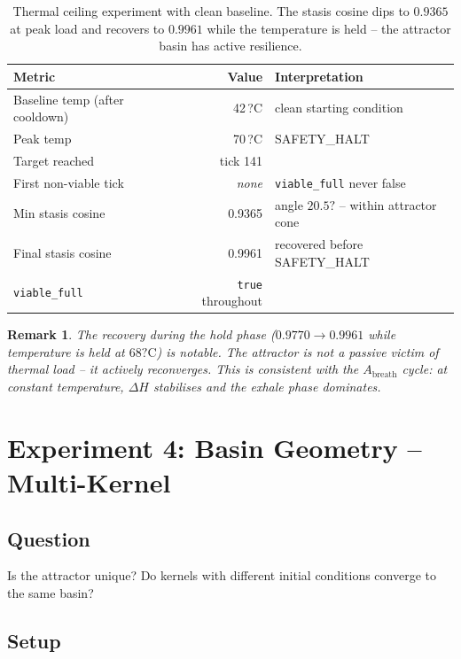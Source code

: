 \documentclass[11pt, a4paper]{article}
\newtheorem{remark}{Remark}
\begin{document}
\begin{table}[h]
\centering
\begin{tabular}{lrl}
\toprule
Metric & Value & Interpretation \\
\midrule
Baseline temp (after cooldown) & 42\,?C & clean starting condition \\
Peak temp & 70\,?C & SAFETY\_HALT \\
Target reached & tick 141 & \\
First non-viable tick & \textit{none} & \texttt{viable\_full} never false \\
Min stasis cosine & 0.9365 & angle $20.5?$ -- within attractor cone \\
Final stasis cosine & 0.9961 & recovered before SAFETY\_HALT \\
\texttt{viable\_full} & \texttt{true} throughout & \\
\bottomrule
\end{tabular}
\caption{Thermal ceiling experiment with clean baseline.
The stasis cosine dips to $0.9365$ at peak load and recovers to $0.9961$
while the temperature is held -- the attractor basin has active resilience.}
\label{tab:ceiling}
\end{table}

\begin{remark}
The recovery during the hold phase ($0.9770 \to 0.9961$ while temperature
is held at $68?\mathrm{C}$) is notable.
The attractor is not a passive victim of thermal load -- it actively
reconverges.
This is consistent with the $A_\text{breath}$ cycle: at constant temperature,
$\Delta H$ stabilises and the exhale phase dominates.
\end{remark}


\section{Experiment 4: Basin Geometry -- Multi-Kernel}
\label{sec:geometry}

\subsection*{Question} Is the attractor unique?
Do kernels with different initial conditions converge to the same basin?

\subsection{Setup}
\end{document}
